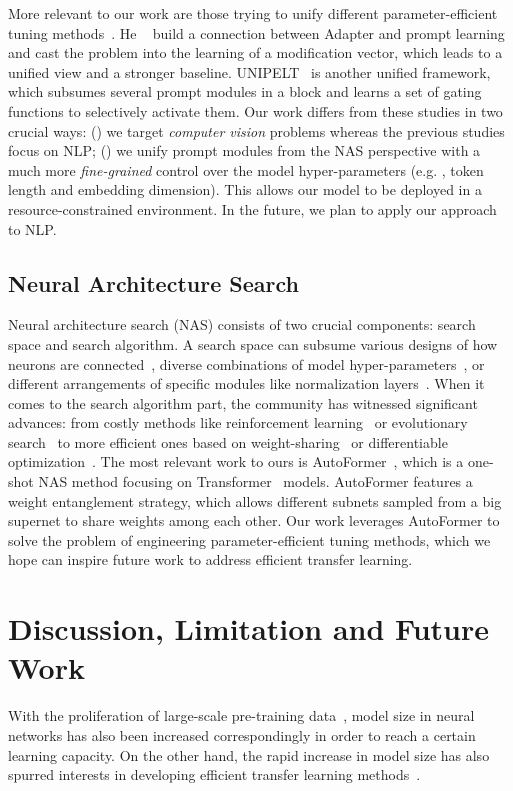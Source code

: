 More relevant to our work are those trying to unify different parameter-efficient tuning methods~\cite{he2021towards,mao2021unipelt}. He \etal~\cite{he2021towards} build a connection between Adapter and prompt learning and cast the problem into the learning of a modification vector, which leads to a unified view and a stronger baseline. UNIPELT~\cite{mao2021unipelt} is another unified framework, which subsumes several prompt modules in a block and learns a set of gating functions to selectively activate them. Our work differs from these studies in two crucial ways: () we target \emph{computer vision} problems whereas the previous studies~\cite{he2021towards,mao2021unipelt} focus on NLP; () we unify prompt modules from the NAS perspective with a much more \emph{fine-grained} control over the model hyper-parameters (e.g. , token length and embedding dimension). This allows our model to be deployed in a resource-constrained environment. In the future, we plan to apply our approach to NLP.

\subsection{Neural Architecture Search} Neural architecture search (NAS) consists of two crucial components: search space and search algorithm. A search space can subsume various designs of how neurons are connected~\cite{zoph2018learning}, diverse combinations of model hyper-parameters~\cite{zoph2016neural}, or different arrangements of specific modules like normalization layers~\cite{zhou2021osnet}. When it comes to the search algorithm part, the community has witnessed significant advances: from costly methods like reinforcement learning~\cite{zoph2016neural} or evolutionary search~\cite{real2017large} to more efficient ones based on weight-sharing~\cite{pham2018efficient} or differentiable optimization~\cite{liu2018darts}. The most relevant work to ours is AutoFormer~\cite{chen2021autoformer}, which is a one-shot NAS method focusing on Transformer~\cite{vaswani2017attention} models. AutoFormer features a weight entanglement strategy, which allows different subnets sampled from a big supernet to share weights among each other. Our work leverages AutoFormer to solve the problem of engineering parameter-efficient tuning methods, which we hope can inspire future work to address efficient transfer learning.

\section{Discussion, Limitation and Future Work} With the proliferation of large-scale pre-training data~\cite{zhang2022bamboo,radford2021learning,yuan2021florence}, model size in neural networks has also been increased correspondingly in order to reach a certain learning capacity. On the other hand, the rapid increase in model size has also spurred interests in developing efficient transfer learning methods~\cite{jia2022visual,zhou2021learning}.

